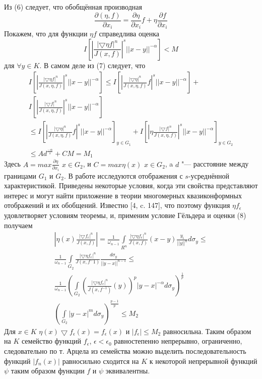 Из (6) следует, что обобщённая производная
\begin{equation}
\frac{\partial(\eta,f)}{\partial x_i}=\frac{\partial\eta}{\partial x_i}f+\eta\frac{\partial f}{\partial x_i}
\end{equation}
Покажем, что для функции $\eta f$ справедлива оценка
$$
I\left[\left|\frac{|\bigtriangledown\eta f|^{n}}{J(x,f)}
\right|^{s}||x-y||^{-\alpha}\right]<M
$$
для $\forall y\in K$. В самом деле из (7) следует, что
\begin{multline}
I\left[\left|\frac{|\bigtriangledown\eta f|^{n}}{J(x,\eta,f)}
\right|^{s}||x-y||^{-\alpha}\right]\leq I\left[\left|\frac{|\bigtriangledown\eta|^{n}}{J(x,\eta,f)}f
\right|^{s}||x-y||^{-\alpha}\right]+\\I\left[\left|\frac{|\bigtriangledown f|^{n}}{J(x,\eta,f)}
\right|^{s}||x-y||^{-\alpha}\right]
\\
\leq I\left[\left|\frac{|\bigtriangledown\eta|^{n}}{J(x,\eta,f)}f
\right|^{s}||x-y||^{-\alpha}\right]_{y\in G_1}+I\left[\left|\eta\frac{|\bigtriangledown f|^{n}}{J(x,\eta,f)}
\right|^{s}||x-y||^{-\alpha}\right]_{y\in G_2}\\\leq Ad^{\frac{-\alpha}{s}}+CM=M_1
\end{multline}
Здесь $A=max\frac{\partial\eta}{\partial x_i}$ $x\in G_2$, и $C=max\eta(x)$ $x\in G_2$, a $d$ "--- расстояние между границами $G_1$ и $G_2$. В работе исследуются отображения с $s$-усреднённой характеристикой. Приведены некоторые условия, когда эти свойства представляют интерес и могут найти приложение в теории многомерных квазиконформных отображений и их обобщений.
 Известно [4, c. 147], что поэтому функция $\eta f_\epsilon$ удовлетворяет условиям теоремы, и, применим условие Гёльдера и оценки (8) получаем
 \begin{multline}
 \left|\eta(x)\frac{|\bigtriangledown f_\epsilon|^n}{J(x,f)}\right|=\frac{1}{\omega_{n-1}}\int\limits_{R^n}\frac{|\bigtriangledown\eta f_\epsilon|^n}{J(x,f)}(x-y)\frac{y_i}{||y||^n}d\sigma_{y}\leq
 \\
 \frac{1}{\omega_{n-1}}\int\limits_{G_2}\frac{|\bigtriangledown\eta f_\epsilon|^n}{J(x,f^-1)}\frac{d\sigma_{y}}{||y-x||^{n-1}}\leq
 \\
 \frac{1}{\omega_{n-1}}\left(\int\limits_{G_2}\left(\frac{|\bigtriangledown\eta f_\epsilon|^n}{J(x,f^{-1})}(y)\right)^p |y-x|^{-\alpha}d\sigma_y\right)^{\frac{1}{p}}\\\left(\int\limits_{G_2}|y-x|^{m}d\sigma_y\right)^{\frac{p-1}{p}}\leq M_2
\end{multline}
Для $x\in K$ $\eta(x)\bigtriangledown f_{\epsilon}(x)=f_{\epsilon}(x)$ и $|f_\epsilon|\leq M_2$ равносильна.
Таким образом на $K$ семейство функций $f_\epsilon$, $\epsilon<\epsilon_0$ равностепенно непрерывно, ограниченно, следовательно по т. Арцела из семейства можно выделить последовательность функций $|f_{n}(x)|$ равносильно сходится на $K$ к некоторой непрерывной функций $\psi$ таким образом функции $f$ и $\psi$ эквивалентны.


